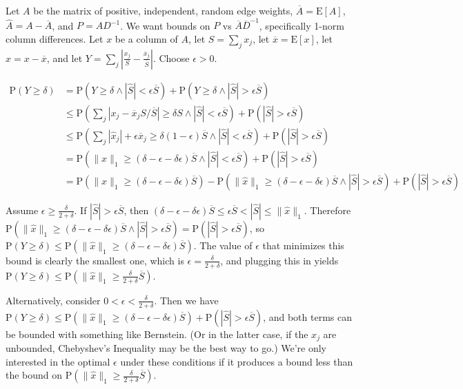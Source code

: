 \documentclass{article}
\newcommand \E[1] {\mathrm E \left[#1\right]} %
\newcommand \p[1] {\mathrm P \left(#1\right)}
\newcommand \inv [1] {{#1}^{-1}} %
\begin{document}
Let $A$ be the matrix of positive, independent, random edge weights, $\overline A = \E A$, $\hat A = A-\overline A$, and $P=A\inv D$. We want bounds on $P$ vs $\overline A\inv{\overline D}$, specifically 1-norm column differences. Let $x$ be a column of $A$, let $S=\sum_j x_j$, let $\overline x = \E x$, let $\hat x = x-\overline x$, and let $Y=\sum_j |\frac {x_j}S - \frac{\overline x_j}{\overline S}|$. Choose $\epsilon>0$.

\begin{align*}
\p{Y\geq\delta} &= \p{Y\geq\delta \wedge |\hat S|<\epsilon\overline S} + \p{Y\geq\delta \wedge |\hat S|>\epsilon\overline S} \\
&\leq \p{\sum_j \left|x_j-\overline x_j S/\overline S \right| \geq \delta S \wedge |\hat S|<\epsilon \overline S} + \p{|\hat S|>\epsilon\overline S} \\
&\leq \p{\sum_j |\hat x_j| + \epsilon\overline x_j \geq \delta(1-\epsilon)\overline S \wedge |\hat S|<\epsilon\overline S} + \p{|\hat S|>\epsilon\overline S} \\
&= \p{\|\hat x\|_1 \geq (\delta-\epsilon-\delta\epsilon)\overline S \wedge |\hat S|<\epsilon\overline S} + \p{|\hat S|>\epsilon\overline S} \\
&= \p{\|\hat x\|_1 \geq (\delta-\epsilon-\delta\epsilon)\overline S} - \p{\|\hat x\|_1 \geq (\delta-\epsilon-\delta\epsilon)\overline S \wedge |\hat S|>\epsilon\overline S} + \p{|\hat S|>\epsilon\overline S}
\end{align*}

Assume $\epsilon\geq\frac\delta{2+\delta}$. If $|\hat S|>\epsilon\overline S$, then $(\delta-\epsilon-\delta\epsilon)\overline S \leq \epsilon\overline S < |\hat S| \leq \|\hat x\|_1$. Therefore $\p{\|\hat x\|_1 \geq (\delta-\epsilon-\delta\epsilon)\overline S \wedge |\hat S|>\epsilon\overline S} = \p{|\hat S|>\epsilon\overline S}$, so $\p{Y\geq\delta} \leq \p{\|\hat x\|_1 \geq (\delta-\epsilon-\delta\epsilon)\overline S}$. The value of $\epsilon$ that minimizes this bound is clearly the smallest one, which is $\epsilon=\frac\delta{2+\delta}$, and plugging this in yields $\p{Y\geq\delta} \leq \p{\|\hat x\|_1 \geq \frac\delta{2+\delta}\overline S}$.

Alternatively, consider $0<\epsilon<\frac\delta{2+\delta}$. Then we have $\p{Y\geq\delta} \leq \p{\|\hat x\|_1 \geq (\delta-\epsilon-\delta\epsilon)\overline S} + \p{|\hat S|>\epsilon\overline S}$, and both terms can be bounded with something like Bernstein. (Or in the latter case, if the $x_j$ are unbounded, Chebyshev's Inequality may be the best way to go.) We're only interested in the optimal $\epsilon$ under these conditions if it produces a bound less than the bound on $\p{\|\hat x\|_1 \geq \frac\delta{2+\delta}\overline S}$.
\end{document}

